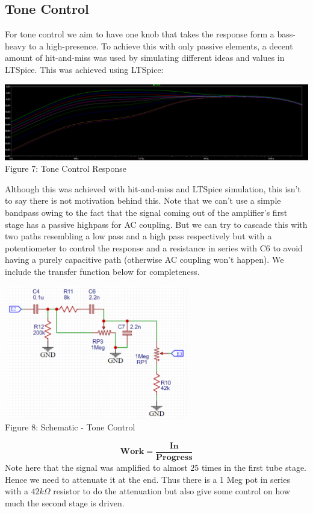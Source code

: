 \documentclass[11pt]{article}
\newcommand{\tab}{\hspace*{6mm}}
\begin{document}
\subsection{Tone Control}
\tab For tone control we aim to have one knob that takes the response form a bass-heavy to a high-presence. To achieve this with only passive elements, a decent amount of hit-and-miss was used by simulating different ideas and values in LTSpice. This was achieved using LTSpice:
\begin{center}\includegraphics[width=\textwidth]{Documentation LaTeX/response.png}\\\small{Figure 7: Tone Control Response}\end{center}
\tab Although this was achieved with hit-and-miss and LTSpice simulation, this isn't to say there is not motivation behind this. Note that we can't use a simple bandpass owing to the fact that the signal coming out of the amplifier's first stage has a passive highpass for AC coupling. But we can try to cascade this with two paths resembling a low pass and a high pass respectively but with a potentiometer to control the response and a resistance in series with C6 to avoid having a purely capacitive path (otherwise AC coupling won't happen). We include the transfer function below for completeness. 
\begin{center}\includegraphics[width=0.6\textwidth]{Documentation LaTeX/sch_tone.png}\\\small{Figure 8: Schematic - Tone Control}\end{center}
\[\textbf{Work} = \frac{\textbf{In}}{\textbf{Progress}}\]
\tab Note here that the signal was amplified to almost $25$ times in the first tube stage. Hence we need to attenuate it at the end. Thus there is a 1 Meg pot in series with a $42k\Omega$ resistor to do the attenuation but also give some control on how much the second stage is driven.
\newpage
\vspace*{12mm}
\end{document}
